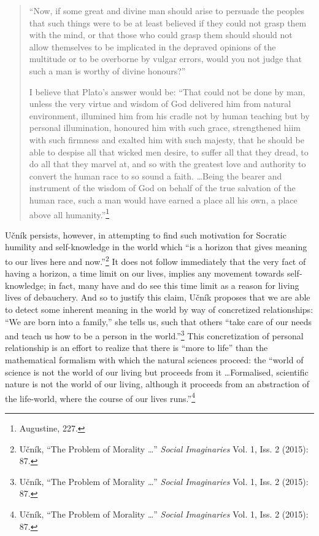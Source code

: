 \documentclass[12pt]{article}
\begin{document}
	\begin{quote}
	\singlespacing
	\footnotesize
	
	``Now, if some great and divine man should arise to persuade the peoples that such things were to be at least believed if they could not grasp them with the mind, or that those who could grasp them should should not allow themselves to be implicated in the depraved opinions of the multitude or to be overborne by vulgar errors, would you not judge that such a man is worthy of divine honours?''
	
	I believe that Plato's answer would be: ``That could not be done by man, unless the very virtue and wisdom of God delivered him from natural environment, illumined him from his cradle not by human teaching but by personal illumination, honoured him with such grace, strengthened hiim with such firmness and exalted him with such majesty, that he should be able to despise all that wicked men desire, to suffer all that they dread, to do all that they marvel at, and so with the greatest love and authority to convert the human race to so sound a faith. \ldots Being the bearer and instrument of the wisdom of God on behalf of the true salvation of the human race, such a man would have earned a place all his own, a place above all humanity.''\footnote{Augustine, 227.}
	
	\end{quote}
	
	U\v{c}n\'{i}k persists, however, in attempting to find such motivation for Socratic humility and self-knowledge in the world which ``is a horizon that gives meaning to our lives here and now.''\footnote{U\v{c}n\'{i}k, ``The Problem of Morality \ldots'' \emph{Social Imaginaries} Vol. 1, Iss. 2 (2015): 87.} It does not follow immediately that the very fact of having a horizon, a time limit on our lives, implies any movement towards self-knowledge; in fact, many have and do see this time limit as a reason for living lives of debauchery. And so to justify this claim, U\v{c}n\'{i}k proposes that we are able to detect some inherent meaning in the world by way of concretized relationships: ``We are born into a family,'' she tells us, such that others ``take care of our needs and teach us how to be a person in the world.''\footnote{U\v{c}n\'{i}k, ``The Problem of Morality \ldots'' \emph{Social Imaginaries} Vol. 1, Iss. 2 (2015): 87.} This concretization of personal relationship is an effort to realize that there is ``more to life'' than the mathematical formalism with which the natural sciences proceed: the ``world of science is not the world of our living but proceeds from it \ldots Formalised, scientific nature is not the world of our living, although it proceeds from an abstraction of the life-world, where the course of our lives runs.''\footnote{U\v{c}n\'{i}k, ``The Problem of Morality \ldots'' \emph{Social Imaginaries} Vol. 1, Iss. 2 (2015): 87.}
	
\end{document}
